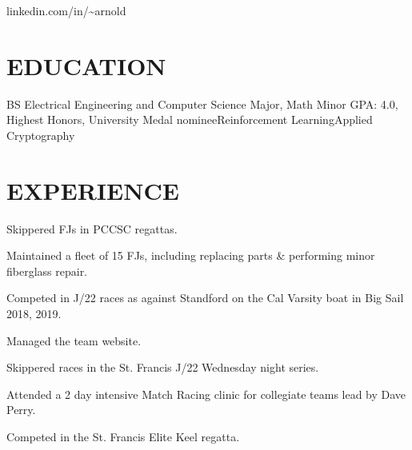 \documentclass[10pt]{article}
\begin{document}
				 {linkedin.com/in/{\textasciitilde}arnold}      

\section*{EDUCATION}

    {BS {\textendash} Electrical Engineering and Computer Science Major, Math Minor}
{GPA: 4.0, Highest Honors, University Medal nominee}{Reinforcement Learning}{Applied Cryptography}


\section*{EXPERIENCE}

              \begin{accomplishments}					        
                \item Skippered FJs in PCCSC regattas.
                \item Maintained a fleet of 15 FJs, including replacing parts \& performing minor fiberglass repair.
                \item Competed in J/22 races as against Standford on the Cal Varsity boat in Big Sail 2018, 2019.
                \item Managed the team website.
               \end{accomplishments}

              \begin{accomplishments}					        
                \item Skippered races in the St. Francis J/22 Wednesday night series.
                \item Attended a 2 day intensive Match Racing clinic for collegiate teams lead by Dave Perry.
              \end{accomplishments}

              \begin{accomplishments}					        
                \item Competed in the St. Francis Elite Keel regatta.
              \end{accomplishments}
\end{document}
